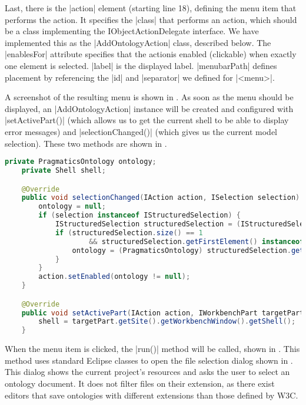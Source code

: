 Last, there is the |action| element (starting line 18), defining the menu item
that performs the action. It specifies the |class| that performs an action, which should be a
class implementing the IObjectActionDelegate interface. We have implemented this
as the |AddOntologyAction| class, described below. The |enablesFor| attribute
specifies that the actionis enabled (clickable) when exactly one element is
selected. |label| is the displayed label. |menubarPath| defines
placement by referencing the |id| and |separator| we defined for |<menu>|.

A screenshot of the resulting menu is shown in . As soon
as the menu should be displayed, an |AddOntologyAction| instance will be created
and configured with |setActivePart()| (which allows us to
get the current shell to be able to display error messages)
and |selectionChanged()| (which gives us the current model selection). These two
methods are shown in .


\begin{lstlisting}[language=Java,float,label=lst:AddOntologyAction_config,
caption=AddOntologyAction setActivePart() and selectionChanged()]
	private PragmaticsOntology ontology;
	private Shell shell;

	@Override
	public void selectionChanged(IAction action, ISelection selection) {
		ontology = null;
		if (selection instanceof IStructuredSelection) {
			IStructuredSelection structuredSelection = (IStructuredSelection) selection;
			if (structuredSelection.size() == 1
					&& structuredSelection.getFirstElement() instanceof PragmaticsOntology) {
				ontology = (PragmaticsOntology) structuredSelection.getFirstElement();
			}
		}
		action.setEnabled(ontology != null);
	}

	@Override
	public void setActivePart(IAction action, IWorkbenchPart targetPart) {
		shell = targetPart.getSite().getWorkbenchWindow().getShell();
	}
\end{lstlisting}

When the menu item is clicked, the |run()| method will be called, shown in
. This method uses standard Eclipse classes to
open the file selection dialog shown in . This dialog
shows the current project's resources and asks the user to select an ontology
document. It does not filter files on their extension, as there exist editors
that save ontologies with different extensions than those defined by W3C.

